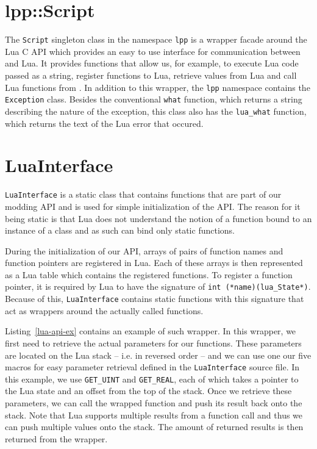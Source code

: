\section{lpp::Script}

The \texttt{Script} singleton class in the namespace \texttt{lpp} is a wrapper facade around the Lua C API which provides an easy to use
interface for communication between \cpp and Lua. It provides functions that allow us, for example, to execute Lua code passed as a string,
register \cpp functions to Lua, retrieve values from Lua and call Lua functions from \cpp. In addition to this wrapper, the \texttt{lpp}
namespace contains the \texttt{Exception} class. Besides the conventional \texttt{what} function, which returns a string describing the
nature of the exception, this class also has the \texttt{lua\_what} function, which returns the text of the Lua error that occured.

\section{LuaInterface}

\texttt{LuaInterface} is a static class that contains functions that are part of our modding API and is used for simple initialization
of the API. The reason for it being static is that Lua does not understand the notion of a function bound to an instance of a class
and as such can bind only static functions.

During the initialization of our API, arrays of pairs of function names and function pointers are registered in Lua. Each of
these arrays is then represented as a Lua table which contains the registered functions.
To register a function pointer, it is required by Lua to have the signature of \texttt{int (*name)(lua\_State*)}. Because of this,
\texttt{LuaInterface} contains static functions with this signature that act as wrappers around the actually called functions.

Listing~\ref{lua-api-ex} contains an example of such wrapper. In this wrapper, we first need to retrieve the actual parameters for our
functions. These parameters are located on the Lua stack -- i.e. in reversed order -- and we can use one our five macros for easy
parameter retrieval defined in the \texttt{LuaInterface} source file. In this example, we use \texttt{GET\_UINT} and \texttt{GET\_REAL},
each of which takes a pointer to the Lua state and an offset from the top of the stack. Once we retrieve these parameters, we can call the
wrapped function and push its result back onto the stack. Note that Lua supports multiple results from a function call and thus we can
push multiple values onto the stack. The amount of returned results is then returned from the wrapper.

